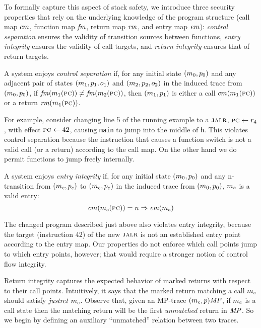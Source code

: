 \documentclass[acmsmall,review,anonymous]{acmart}\settopmatter{printfolios=true,printccs=false,printacmref=false}
\begin{document}
{To formally capture this aspect of stack safety, we introduce three
security properties that rely on the underlying knowledge of the
program structure (call map $cm$, function map $\mathit{fm}$, return map $\mathit{rm}$, and entry
map $\mathit{em}$): {\em control separation} ensures the validity of transition
sources between functions, {\em entry integrity} ensures the validity
of call targets, and {\em return integrity} ensures that of
return targets.

A system enjoys {\em control separation}
if, for any initial state \((m_0, p_0)\) and any adjacent pair of states
\((m_1,p_1,o_1)\) and \((m_2,p_2,o_2)\)
in the induced trace from \((m_0,p_0)\),
if \(\mathit{fm}(m_1(\textsc{pc})) \not = \mathit{fm}(m_2(\textsc{pc}))\),
then \((m_1,p_1)\) is either a call \(cm(m_1(\textsc{pc}))\)
or a return \(\mathit{rm}(m_1(\textsc{pc}))\).

\smallskip

For example, consider changing line 5 of the running example to a $\textsc{jalr}$,
$\textsc{pc} \leftarrow r_4$, with effect $\textsc{pc} \leftarrow 42$, causing {\tt main}
to jump into the middle of {\tt h}.
This violates control separation because the instruction that causes a
function switch is not a valid call (or a return) according to the
call map. On the other hand we do permit functions to jump freely internally.

A system enjoys {\em entry integrity}
if, for any initial state \((m_0, p_0)\)
and any n-transition from \((m_c,p_c)\) to
\((m_e, p_e)\) in the induced trace from
\((m_0,p_0)\), $m_e$ is a valid entry:
\[cm(m_c(\textsc{pc})) = n \Rightarrow \mathit{em}(m_e)\]

The changed program described just above also violates entry integrity,
because the target (instruction 42) of the new $\textsc{jalr}$ is not an established
entry point according to the entry map. Our properties do not enforce which
call points jump to which entry points, however; that would require a stronger
notion of control flow integrity.

\newcommand*{\Unmatched}{\mathit{um}}

Return integrity captures the expected behavior of marked returns with
respect to their call points. Intuitively, it says that the marked return
matching a call $m_c$ should satisfy $\mathit{justret}\ m_c$.
Observe that, given an MP-trace $(m_c,p)\mathit{MP}$, if $m_c$ is
a call state then the matching return will be the first \emph{unmatched} return
in $\mathit{MP}$. So we begin by defining an auxiliary ``unmatched'' relation between
two traces.

}
\end{document}
